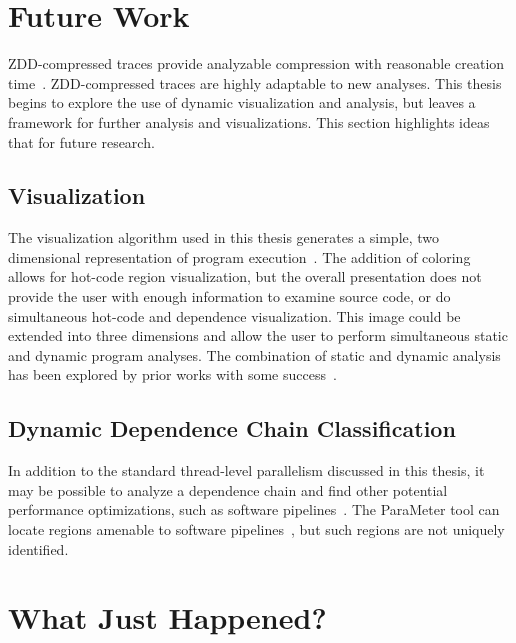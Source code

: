 \documentclass[defaultstyle,11pt]{thesis}
\begin{document}
\chapter{Future Work}

ZDD-compressed traces provide analyzable compression with reasonable
creation time~\cite{price:10:cgo}.  ZDD-compressed traces are highly
adaptable to new analyses.  This thesis begins to explore the use of
dynamic visualization and analysis, but leaves a framework for further
analysis and visualizations.  This section highlights ideas that for
future research.

\section{Visualization}

The visualization algorithm used in this thesis generates a simple,
two dimensional representation of program
execution~\cite{price:08:pact}.  The addition of coloring allows for
hot-code region visualization, but the overall presentation does not
provide the user with enough information to examine source code, or do
simultaneous hot-code and dependence visualization.  This image could
be extended into three dimensions and allow the user to perform
simultaneous static and dynamic program analyses.  The combination of
static and dynamic analysis has been explored by prior works with some
success~\cite{eisenbarth:01:icsm,park:93:rts,lindlan:2000:tsf}.

\section{Dynamic Dependence Chain Classification}

In addition to the standard thread-level parallelism discussed in this
thesis, it may be possible to analyze a dependence chain and find
other potential performance optimizations, such as software
pipelines~\cite{ebcioglu:87:wmm,jones:91:wmm,Allan:1995rt}.  The
ParaMeter tool can locate regions amenable to software
pipelines~\cite{price:08:pact}, but such regions are not uniquely
identified.


\chapter{What Just Happened?}
\label{chap:conclusion}
\end{document}
